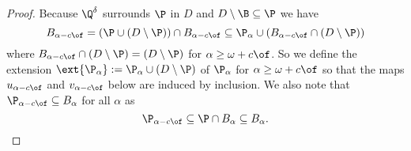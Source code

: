 \begin{proof}
  Because $\Q^\delta$ surrounds $\P$ in $D$ and $D\setminus \B\subseteq \P$ we have
  \[ B_{\alpha-c\of} = (\P\cup (D\setminus \P))\cap B_{\alpha -c\of}\subseteq \P_\alpha \cup (B_{\alpha - c\of}\cap (D\setminus \P))\]
  where $B_{\alpha - c\of}\cap (D\setminus \P) = (D\setminus \P)$ for $\alpha\geq \omega+c\of$.
  So we define the extension $\ext{\P_\alpha} := \P_\alpha\cup (D\setminus \P)$ of $\P_\alpha$ for $\alpha\geq\omega+c\of$ so that the maps $u_{\alpha-c\of}$ and $v_{\alpha-c\of}$ below are induced by inclusion.
  We also note that $\P_{\alpha-c\of}\subseteq B_\alpha$ for all $\alpha$ as
  \[ \P_{\alpha-c\of}\subseteq \P\cap B_\alpha\subseteq B_\alpha.\]


\end{proof}
